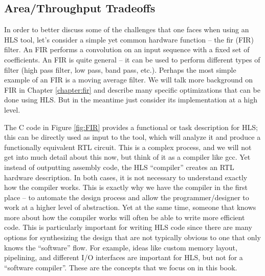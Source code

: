 
\subsection{Area/Throughput Tradeoffs}
\label{sec:filterThroughputTradeoffs}

In order to better discuss some of the challenges that one faces when using an HLS tool, let's consider a simple yet common hardware function -- the \gls{fir} (FIR) filter. An FIR performs a convolution on an input sequence with a fixed set of coefficients. An FIR is quite general -- it can be used to perform different types of filter (high pass filter, low pass, band pass, etc.).  Perhaps the most simple example of an FIR is a moving average filter. We will talk more background on FIR in Chapter \ref{chapter:fir} and describe many specific optimizations that can be done using HLS. But in the meantime just consider its implementation at a high level. 

The C code in Figure \ref{fig:FIR} provides a functional or task description for HLS; this can be directly used as input to the \VHLS tool, which will analyze it and  produce a functionally equivalent RTL circuit. This is a complex process, and we will not get into much detail about this now, but think of it as a compiler like gcc. Yet instead of outputting assembly code, the HLS ``compiler'' creates an RTL hardware description. In both cases, it is not necessary to understand exactly how the compiler works. This is exactly why we have the compiler in the first place -- to automate the design process and allow the programmer/designer to work at a higher level of abstraction. Yet at the same time, someone that knows more about how the compiler works will often be able to write more efficient code. This is particularly important for writing HLS code since there are many options for synthesizing the design that are not typically obvious to one that only knows the ``software'' flow. For example, ideas like custom memory layout, pipelining, and different I/O interfaces are important for HLS, but not for a ``software compiler''. These are the concepts that we focus on in this book.

